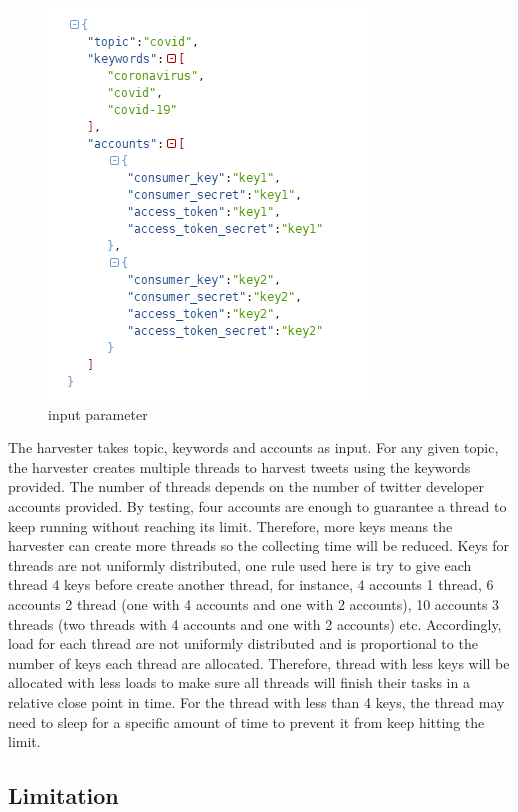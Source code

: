 \begin{figure}[H]
\centering
\includegraphics[scale=0.8]{city_analytics/report/images/harvester_input.png}
\caption{input parameter}
\label{fig:input parameter}
\end{figure}


The harvester takes topic, keywords and accounts as input. For any given topic, the harvester creates multiple threads to harvest tweets using the keywords provided. The number of threads depends on the number of twitter developer accounts provided. By testing, four accounts are enough to guarantee a thread to keep running without reaching its limit. Therefore, more keys means the harvester can create more threads so the collecting time will be reduced. Keys for threads are not uniformly distributed, one rule used here is try to give each thread 4 keys before create another thread, for instance, 4 accounts 1 thread, 6 accounts 2 thread (one with 4 accounts and one with 2 accounts), 10 accounts 3 threads (two threads with 4 accounts and one with 2 accounts) etc. Accordingly, load for each thread are not uniformly distributed and is proportional to the number of keys each thread are allocated. Therefore, thread with less keys will be allocated with less loads to make sure all threads will finish their tasks in a relative close point in time. For the thread with less than 4 keys, the thread may need to sleep for a specific amount of time to prevent it from keep hitting the limit.


\subsection{Limitation}
